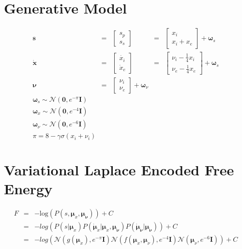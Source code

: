 \documentclass[11pt]{article}
\begin{document}
\section*{Generative Model}
$$
\begin{array}{lllll}
    \mathbf{s} &=&  \left[\begin{array}{c} s_p \\ s_s\end{array}\right] &= &
    \left[\begin{array}{c} x_i \\ x_i + x_e \end{array}\right] +
    \bm{\omega}_s \\
    \mathbf{\dot{x}} &=&  \left[\begin{array}{c} \dot{x_i} \\ \dot{x}_e
    \end{array}\right]  &=& \left[\begin{array}{c} \nu_i -\frac{1}{4}
    x_i\\ \nu_e -\frac{1}{4} x_e\end{array}\right] + \bm{\omega}_s
    \\ \bm{\nu} &=& \left[\begin{array}{c} \nu_i \\ \nu_e \end{array}\right] +
    \bm{\omega}_{\nu}\\
    \bm{\omega}_s \sim \mathcal{N}(\mathbf{0}, e^{-\pi} \mathbf{I})\\
    \bm{\omega}_x \sim \mathcal{N}(\mathbf{0}, e^{-4} \mathbf{I})\\
    \bm{\omega}_\nu \sim \mathcal{N}(\mathbf{0}, e^{-6} \mathbf{I})\\
    \pi = 8-\gamma\sigma(x_i + \nu_i)
\end{array}
$$

\section*{Variational Laplace Encoded Free Energy}

$$
    \begin{array}{lll}
        F &= &-\mathrm{log}(P(s,\bm{\mu}_x, \bm{\mu}_{\bm{\nu}} )) + C \\
          &= & -log( P(s|\bm{\mu}_x) P(\dot{\bm{\mu}}_{x}|\bm{\mu}_x,
          \bm{\mu}_{\bm{\nu}}) P(\dot{\bm{\mu}}_{\bm{\nu}}|\bm{\mu}_{\bm{\nu}}))
          + C  \\
        & = & -log( \mathcal{N}( g(\bm{\mu}_x),  e^{-\pi}\mathbf{I})
        \mathcal{N}( f(\bm{\mu}_x,\bm{\mu}_\nu), e^{-4}\mathbf{I})
        \mathcal{N}(\bm{\mu}_{\nu}, e^{-6}\mathbf{I}) ) + C  \\
    \end{array}
$$
\end{document}
